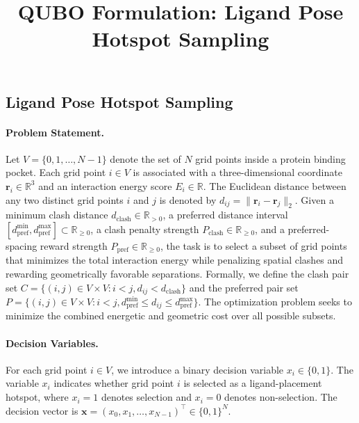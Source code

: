 \documentclass[12pt]{article}
\title{QUBO Formulation: Ligand Pose Hotspot Sampling}
\date{}
\begin{document}
\maketitle

\subsection*{Ligand Pose Hotspot Sampling}

\paragraph{Problem Statement.}
Let $V = \{0, 1, \dots, N-1\}$ denote the set of $N$ grid points inside a protein binding pocket. Each grid point $i \in V$ is associated with a three-dimensional coordinate $\mathbf{r}_i \in \mathbb{R}^3$ and an interaction energy score $E_i \in \mathbb{R}$. The Euclidean distance between any two distinct grid points $i$ and $j$ is denoted by $d_{ij} = \|\mathbf{r}_i - \mathbf{r}_j\|_2$. Given a minimum clash distance $d_{\text{clash}} \in \mathbb{R}_{>0}$, a preferred distance interval $[d_{\text{pref}}^{\min}, d_{\text{pref}}^{\max}] \subset \mathbb{R}_{\ge 0}$, a clash penalty strength $P_{\text{clash}} \in \mathbb{R}_{\ge 0}$, and a preferred-spacing reward strength $P_{\text{pref}} \in \mathbb{R}_{\ge 0}$, the task is to select a subset of grid points that minimizes the total interaction energy while penalizing spatial clashes and rewarding geometrically favorable separations. Formally, we define the clash pair set $C = \{(i,j) \in V \times V : i < j, d_{ij} < d_{\text{clash}}\}$ and the preferred pair set $P = \{(i,j) \in V \times V : i < j, d_{\text{pref}}^{\min} \le d_{ij} \le d_{\text{pref}}^{\max}\}$. The optimization problem seeks to minimize the combined energetic and geometric cost over all possible subsets.

\paragraph{Decision Variables.}
For each grid point $i \in V$, we introduce a binary decision variable $x_i \in \{0,1\}$. The variable $x_i$ indicates whether grid point $i$ is selected as a ligand-placement hotspot, where $x_i = 1$ denotes selection and $x_i = 0$ denotes non-selection. The decision vector is $\mathbf{x} = (x_0, x_1, \dots, x_{N-1})^\top \in \{0,1\}^N$.
\end{document}
